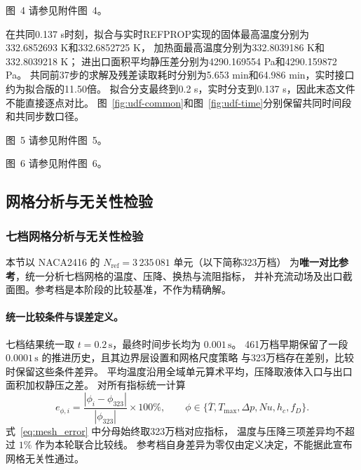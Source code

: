 \documentclass[stage2,fontset=fandol]{ydzjreport}
\makeatletter
\newcommand{\submissionnumber}[1]{\def\@currentlabel{#1}}
\makeatother
\begin{document}
\par\noindent \begingroup\submissionnumber{4}\label{fig:udf-fit-error}\endgroup 图~4 请参见附件图~4。\par


在共同0.137 s时刻，拟合与实时REFPROP实现的固体最高温度分别为332.6852693 K和332.6852725 K，
加热面最高温度分别为332.8039186 K和332.8039218 K；
进出口面积平均静压差分别为4290.169554 Pa和4290.159872 Pa。
共同前37步的求解及残差读取耗时分别为5.653 min和64.986 min，实时接口约为拟合版的11.50倍。
拟合分支最终到0.2 s，实时分支到0.137 s，因此末态文件不能直接逐点对比。
图~\ref{fig:udf-common}和图~\ref{fig:udf-time}分别保留共同时间段和共同步数口径。


\par\noindent \begingroup\submissionnumber{5}\label{fig:udf-common}\endgroup 图~5 请参见附件图~5。\par



\par\noindent \begingroup\submissionnumber{6}\label{fig:udf-time}\endgroup 图~6 请参见附件图~6。\par


\subsection{网格分析与无关性检验}
\subsubsection{七档网格分析与无关性检验}

本节以 NACA2416 的 $N_{\mathrm{ref}}=3\,235\,081$ 单元（以下简称323万档）
为\textbf{唯一对比参考}，统一分析七档网格的温度、压降、换热与流阻指标，
并补充流动场及出口截面图。参考档是本阶段的比较基准，不作为精确解。

\paragraph{统一比较条件与误差定义。}

七档结果统一取 $t=0.2\,\mathrm{s}$，最终时间步长均为 $0.001\,\mathrm{s}$。
461万档早期保留了一段 $0.0001\,\mathrm{s}$ 的推进历史，且其边界层设置和网格尺度策略
与323万档存在差别，比较时保留这些条件差异。
平均温度沿用全域单元算术平均，压降取液体入口与出口面积加权静压之差。
对所有指标统一计算
\begin{equation}
e_{\phi,i}=\frac{|\phi_i-\phi_{323}|}{|\phi_{323}|}\times100\%,
\qquad \phi\in\{\overline T,T_{\max},\Delta p,Nu,h_c,f_D\}.
\label{eq:mesh_error}
\end{equation}
式~\eqref{eq:mesh_error} 中分母始终取323万档对应指标，
温度与压降三项差异均不超过 $1\%$ 作为本轮联合比较线。
参考档自身差异为零仅由定义决定，不能据此宣布网格无关性通过。
\end{document}
